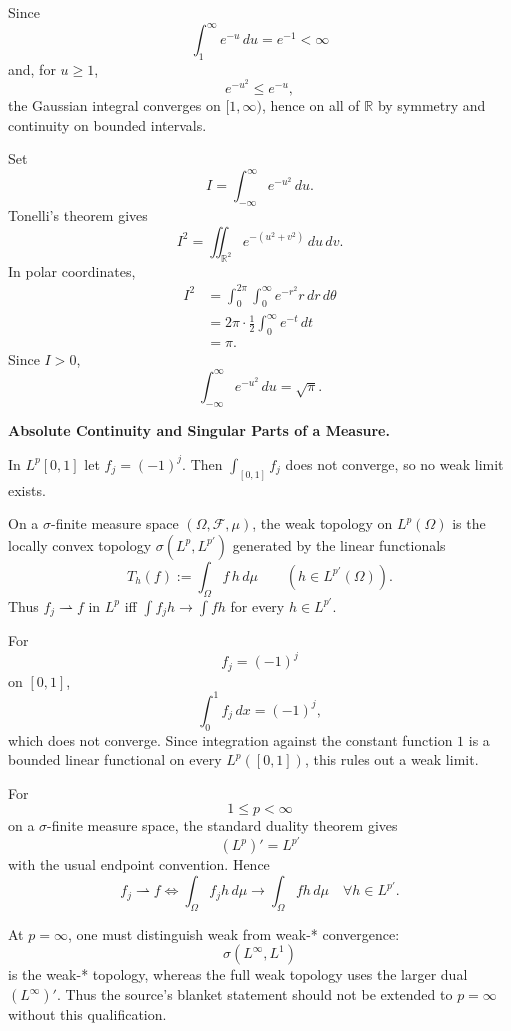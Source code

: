 \begin{solution}
Since
\[
\int_1^\infty e^{-u}\,du=e^{-1}<\infty
\]
and, for \(u\ge1\),
\[
e^{-u^2}\le e^{-u},
\]
the Gaussian integral converges on \([1,\infty)\), hence on all of \(\mathbb R\) by
symmetry and continuity on bounded intervals.

Set
\[
I=\int_{-\infty}^{\infty}e^{-u^2}\,du.
\]
Tonelli's theorem gives
\[
I^2
=
\iint_{\mathbb R^2}e^{-(u^2+v^2)}\,du\,dv.
\]
In polar coordinates,
\[
\begin{aligned}
I^2
&=
\int_0^{2\pi}\int_0^\infty e^{-r^2}r\,dr\,d\theta\\
&=
2\pi\cdot\frac12\int_0^\infty e^{-t}\,dt\\
&=
\pi.
\end{aligned}
\]
Since \(I>0\),
\[
\boxed{
\int_{-\infty}^{\infty}e^{-u^2}\,du=\sqrt\pi.
}
\]
\end{solution}


\begin{problem}[CP-II-0388]
\label{prob:cp-ii-0388}
\textbf{Absolute Continuity and Singular Parts of a Measure.}

\hspace*{1.5em}In $L^p[0,1]$ let $f_j=(-1)^j$. Then $\int_{[0,1]} f_j$ does not converge, so no weak limit exists.

	On a $\sigma$-finite measure space $(\Omega,\mathcal F,\mu)$, the weak topology on $L^{p}(\Omega)$
	is the locally convex topology $\sigma(L^{p},L^{p'})$ generated by the linear functionals
	\[
	T_h(f) := \int_\Omega f\,h\,d\mu \qquad (h\in L^{p'}(\Omega)).
	\]
	Thus $f_j \rightharpoonup f$ in $L^{p}$ iff $\int f_j h \to \int f h$ for every $h\in L^{p'}$.
\end{problem}

\begin{solution}
For
\[
f_j=(-1)^j
\]
on \([0,1]\),
\[
\int_0^1 f_j\,dx=(-1)^j,
\]
which does not converge. Since integration against the constant function \(1\) is a bounded
linear functional on every \(L^p([0,1])\), this rules out a weak limit.

For
\[
1\le p<\infty
\]
on a \(\sigma\)-finite measure space, the standard duality theorem gives
\[
(L^p)'=L^{p'}
\]
with the usual endpoint convention. Hence
\[
\boxed{
f_j\rightharpoonup f
\iff
\int_\Omega f_jh\,d\mu
\to
\int_\Omega fh\,d\mu
\quad\forall h\in L^{p'}.
}
\]

At \(p=\infty\), one must distinguish weak from weak-* convergence:
\[
\sigma(L^\infty,L^1)
\]
is the weak-* topology, whereas the full weak topology uses the larger dual
\((L^\infty)'\). Thus the source's blanket statement should not be extended to
\(p=\infty\) without this qualification.
\end{solution}


